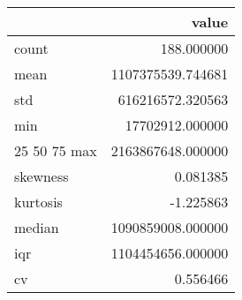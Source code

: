 \begin{tabular}{lr}
\toprule
 & value \\
\midrule
count & 188.000000 \\
mean & 1107375539.744681 \\
std & 616216572.320563 \\
min & 17702912.000000 \\
25%
50%
75%
max & 2163867648.000000 \\
skewness & 0.081385 \\
kurtosis & -1.225863 \\
median & 1090859008.000000 \\
iqr & 1104454656.000000 \\
cv & 0.556466 \\
\bottomrule
\end{tabular}
